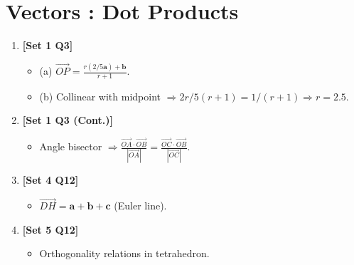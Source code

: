 \documentclass[12pt, a4paper]{article} %
\begin{document}
\section{Vectors : Dot Products}
\begin{enumerate}
    \item \textbf{[Set 1 Q3]}
    \begin{itemize}
        \item (a) $\vec{OP} = \frac{r(2/5 \mathbf{a}) + \mathbf{b}}{r+1}$.
        \item (b) Collinear with midpoint $\Rightarrow 2r/5(r+1) = 1/(r+1) \Rightarrow r = 2.5$.
    \end{itemize}

    \item \textbf{[Set 1 Q3 (Cont.)]}
    \begin{itemize}
        \item Angle bisector $\Rightarrow \frac{\vec{OA} \cdot \vec{OB}}{|\vec{OA}|} = \frac{\vec{OC} \cdot \vec{OB}}{|\vec{OC}|}$.
    \end{itemize}

    \item \textbf{[Set 4 Q12]}
    \begin{itemize}
        \item $\vec{DH} = \mathbf{a}+\mathbf{b}+\mathbf{c}$ (Euler line).
    \end{itemize}

    \item \textbf{[Set 5 Q12]}
    \begin{itemize}
        \item Orthogonality relations in tetrahedron.
    \end{itemize}
\end{enumerate}
\end{document}
